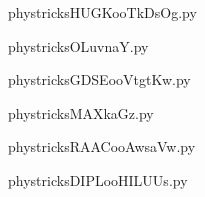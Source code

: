     \newcommand{\CaptionFigHUGKooTkDsOg}{<+Type your caption here+>}
    \begin{center}
        
    \end{center}
    phystricksHUGKooTkDsOg.py

    

    \clearpage
    


    \newcommand{\CaptionFigOLuvnaY}{<+Type your caption here+>}
    \begin{center}
        
    \end{center}
    phystricksOLuvnaY.py

    

    \clearpage
    


    \newcommand{\CaptionFigGDSEooVtgtKw}{<+Type your caption here+>}
    \begin{center}
        
    \end{center}
    phystricksGDSEooVtgtKw.py

    

    \clearpage
    


    \newcommand{\CaptionFigMAXkaGz}{<+Type your caption here+>}
    \begin{center}
        
    \end{center}
    phystricksMAXkaGz.py

    

    \clearpage
    


    \newcommand{\CaptionFigRAACooAwsaVw}{<+Type your caption here+>}
    \begin{center}
        
    \end{center}
    phystricksRAACooAwsaVw.py

    

    \clearpage
    


    \newcommand{\CaptionFigDIPLooHILUUs}{<+Type your caption here+>}
    \begin{center}
        
    \end{center}
    phystricksDIPLooHILUUs.py


